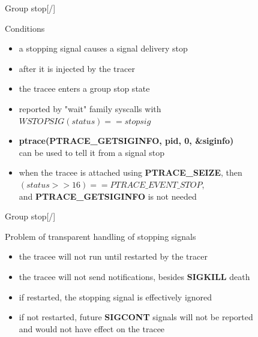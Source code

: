 \documentclass[unicode,aspectratio=169,xcolor={table,dvipsnames,usenames}]{beamer}
\begin{document}
\begin{frame}{\Large Group stop\hfill [\insertframenumber/\inserttotalframenumber]}
\Large
\begin{block}{Conditions}
\begin{itemize}
	\item a stopping signal causes a signal delivery stop
	\item after it is injected by the tracer
	\item the tracee enters a group stop state
	\item reported by "wait" family syscalls with \\
		$WSTOPSIG(status) == stopsig$
	\item \textbf{ptrace(PTRACE\_GETSIGINFO, pid, 0, \&siginfo)} \\
		can be used to tell it from a signal stop
	\item when the tracee is attached using \textbf{PTRACE\_SEIZE}, then \\
		$(status >> 16) == PTRACE\_EVENT\_STOP$, \\
		and \textbf{PTRACE\_GETSIGINFO} is not needed
\end{itemize}
\end{block}
\end{frame}

\begin{frame}{\Large Group stop\hfill [\insertframenumber/\inserttotalframenumber]}
\Large
\begin{block}{Problem of transparent handling of stopping signals}
\begin{itemize}
	\item the tracee will not run until restarted by the tracer
	\item the tracee will not send notifications, besides \textbf{SIGKILL} death
	\item if restarted, the stopping signal is effectively ignored
	\item if not restarted, future \textbf{SIGCONT} signals will not be reported \\
		and would not have effect on the tracee
\end{itemize}
\end{block}
\end{frame}
\end{document}
